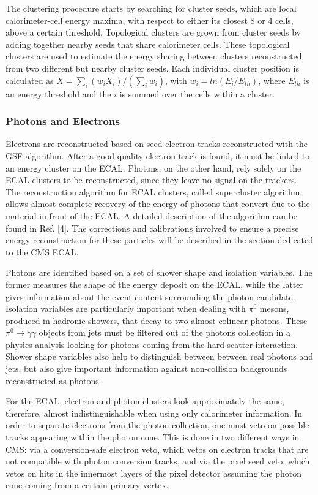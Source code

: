 The clustering procedure starts by searching for cluster seeds, which are local calorimeter-cell energy maxima, with respect to either its closest 8 or 4 cells, above a certain threshold. 
Topological clusters are grown from cluster seeds by adding together nearby seeds that share calorimeter cells. 
These topological clusters are used to estimate the energy sharing between clusters reconstructed from two different but nearby cluster seeds. 
Each individual cluster position is calculated as $X=\sum_{i}(w_{i}X_{i})/(\sum_{i}w_{i})$, with $w_{i}=ln(E_{i}/E_{th})$, where $E_{th}$ is an energy threshold and the $i$ is summed over the cells within a cluster.

\subsubsection{Photons and Electrons}

Electrons are reconstructed based on seed electron tracks reconstructed with the GSF algorithm. 
After a good quality electron track is found, it must be linked to an energy cluster on the ECAL. 
Photons, on the other hand, rely solely on the ECAL clusters to be reconstructed, since they leave no signal on the trackers. 
The reconstruction algorithm for ECAL clusters, called supercluster algorithm, allows almost complete recovery of the energy of photons that convert due to the material in front of the ECAL. 
A detailed description of the algorithm can be found in Ref. [4]. 
The corrections and calibrations involved to ensure a precise energy reconstruction for these particles will be described in the section dedicated to the CMS ECAL. 

Photons are identified based on a set of shower shape and isolation variables. 
The former measures the shape of the energy deposit on the ECAL, while the latter gives information about the event content surrounding the photon candidate. 
Isolation variables are particularly important when dealing with $\pi^{0}$ mesons, produced in hadronic showers, that decay to two almost colinear photons. 
These $\pi^{0}\rightarrow\gamma\gamma$ objects from jets must be filtered out of the photons collection in a physics analysis looking for photons coming from the hard scatter interaction. 
Shower shape variables also help to distinguish between between real photons and jets, but also give important information against non-collision backgrounds reconstructed as photons. 

For the ECAL, electron and photon clusters look approximately the same, therefore, almost indistinguishable when using only calorimeter information. 
In order to separate electrons from the photon collection, one must veto on possible tracks appearing within the photon cone. 
This is done in two different ways in CMS: via a conversion-safe electron veto, which vetos on electron tracks that are not compatible with photon conversion tracks, and via the pixel seed veto, which vetos on hits in the innermost layers of the pixel detector assuming the photon cone coming from a certain primary vertex.

